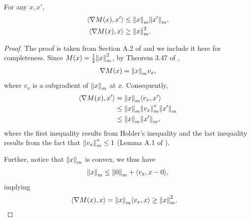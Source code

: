 \documentclass[twoside,11pt]{article}
\newcommand{\indot}[2]{{\left<#1, #2\right>}}
\numberwithin{assucounter}{section}
\begin{document}
\begin{lemma}
  \label{lem gradient of M}
  For any $x, x'$,
  \begin{align}
      \indot{\nabla M(x)}{x'} &\leq \norm{x}_m \norm{x'}_m, \\
      \indot{\nabla M(x)}{x} &\geq \norm{x}_m^2.
  \end{align}
\end{lemma}
\begin{proof}
  The proof is taken from 
  Section A.2 of \citet{chen2020finite} and we include it here for completeness.
  Since $M(x) = \frac{1}{2} \norm{x}_m^2$,
  by Theorem 3.47 of \citet{beck2017first},
  \begin{align}
      \nabla M(x) = \norm{x}_m v_{x},
  \end{align}
  where $v_{x}$ is a subgradient of $\norm{x}_m$ at $x$.
  Consequently,
  \begin{align}
      \indot{\nabla M(x)}{x'} &= \norm{x}_m \indot{v_x}{x'} \\
      &\leq \norm{x}_m \norm{v_x}_m^* \norm{x'}_m \\
      &\leq \norm{x}_m \norm{x'}_m,
  \end{align}
  where the first inequality results from Holder's inequality and the last inequality results from the fact that $\norm{v_x}_m^* \leq 1$ (Lemma A.1 of \citet{chen2020finite}).

  Further, notice that $\norm{x}_m$ is convex, we thus have
  \begin{align}
      \norm{x}_m \leq \norm{0}_m + \indot{v_{x}}{x-0},
  \end{align}
  implying
  \begin{align}
      \indot{\nabla M(x)}{x} &= \norm{x}_m \indot{v_x}{x} \geq \norm{x}_m^2.
  \end{align}
\end{proof}
\end{document}
